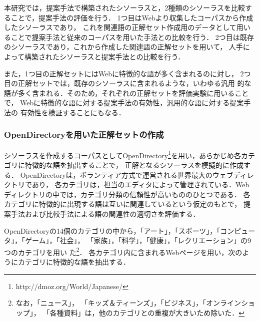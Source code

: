 \documentclass[japanese]{jnlp_1.3a}
\begin{document}
本研究では，提案手法で構築されたシソーラスと，2種類のシソーラスを比較することで，提案手法の評価を行う．
1つ目はWebより収集したコーパスから作成したシソーラスであり，
これを関連語の正解セット作成用のデータとして用いることで提案手法と従来のコーパスを用いた手法との比較を行う．
2つ目は既存のシソーラスであり，これから作成した関連語の正解セットを用いて，
人手によって構築されたシソーラスと提案手法との比較を行う．

また，1つ目の正解セットにはWebに特徴的な語が多く含まれるのに対し，
2つ目の正解セットでは，既存のシソーラスに含まれるような，いわゆる汎用
的な語が多く含まれる．そのため，それぞれの正解セットを評価実験に用いることで，
Webに特徴的な語に対する提案手法の有効性，汎用的な語に対する提案手法の
有効性を検証することにもなる．

\subsubsection{OpenDirectoryを用いた正解セットの作成}
シソーラスを作成するコーパスとしてOpenDirectory\footnote{http://dmoz.org/World/Japanese/}を用い，あらかじめ各カテゴリに特徴的な語を抽出することで，
正解となるシソーラスを模擬的に作成する．
OpenDirectoryは，ボランティア方式で運営される世界最大のウェブディレクトリであり，
各カテゴリは，担当のエディタによって管理されている．Webディレクトリの中では，カテゴリ分類の信頼性が高いもののひとつである．
各カテゴリに特徴的に出現する語は互いに関連しているという仮定のもとで，
提案手法および比較手法による語の関連性の適切さを評価する．


OpenDirectoryの14個のカテゴリの中から，「アート」，「スポーツ」，「コンピュータ」，「ゲーム」，「社会」，
「家族」，「科学」，「健康」，「レクリエーション」の9つのカテゴリを用い\linebreak
た\footnote{なお，「ニュース」，
    「キッズ＆ティーンズ」，「ビジネス」，「オンラインショップ」，
「各種資料」は，他のカテゴリとの重複が大きいため除いた．}．
各カテゴリ内に含まれるWebページを用い，次のようにカテゴリに特徴的な語を抽出する．
\end{document}
